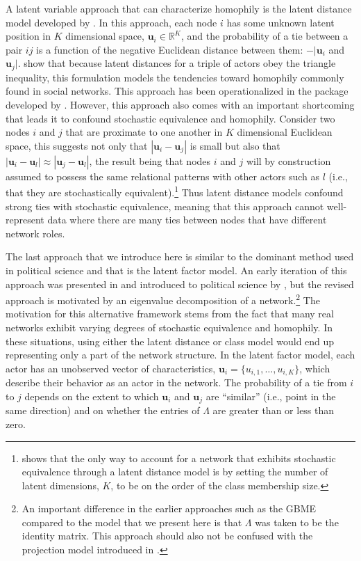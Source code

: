 A latent variable approach that can characterize homophily is the latent distance model developed by \citet{hoff:etal:2002}. In this approach, each node $i$ has some unknown latent position in $K$ dimensional space, $\bm u_{i} \in \mathbb{R}^{K}$, and the probability of a tie between a pair $ij$ is a function of the negative Euclidean distance between them: $-|\bm u_{i}$ and $\bm u_{j}|$. \citet{hoff:etal:2002} show that because latent distances for a triple of actors obey the triangle inequality, this formulation models the tendencies toward homophily commonly found in social networks. This approach has been operationalized in the  package developed by \citet{krivitsky:handcock:2015}. However, this approach also comes with an important shortcoming that leads it to confound stochastic equivalence and homophily. Consider two nodes $i$ and $j$ that are proximate to one another in $K$ dimensional Euclidean space, this suggests not only that $|\bm u_{i} - \bm u_{j}|$ is small but also that $|\bm u_{i} - \bm u_{l}| \approx |\bm u_{j} - \bm u_{l}|$, the result being that nodes $i$ and $j$ will by construction assumed to possess the same relational patterns with other actors such as $l$ (i.e., that they are stochastically equivalent).\footnote{\citet{hoff:2008} shows that the only way to account for a network that exhibits stochastic equivalence through a latent distance model is by setting the number of latent dimensions, $K$, to be on the order of the class membership size.} Thus latent distance models confound strong ties with stochastic equivalence, meaning that this approach cannot well-represent data where there are many ties between nodes that have different network roles. 

The last approach that we introduce here is similar to the dominant method used in political science and that is the latent factor model. An early iteration of this approach was presented in \citet{hoff:2005} and introduced to political science by \citet{hoff:ward:2004}, but the revised approach is motivated by an eigenvalue decomposition of a network.\footnote{An important difference in the earlier approaches such as the GBME compared to the model that we present here is that $\Lambda$ was taken to be the identity matrix. This approach should also not be confused with the projection model introduced in \citet{hoff:etal:2002}.} The motivation for this alternative framework stems from the fact that many real networks exhibit varying degrees of stochastic equivalence and homophily. In these situations, using either the latent distance or class model would end up representing only a part of the network structure. In the latent factor model, each actor has an unobserved vector of characteristics, $\bm u_{i} = \{u_{i,1}, \ldots, u_{i,K} \}$, which describe their behavior as an actor in the network. The probability of a tie from $i$ to $j$ depends on the extent to which $\bm u_{i}$ and $\bm u_{j}$ are ``similar'' (i.e., point in the same direction) and on whether the entries of $\Lambda$ are greater than or less than zero. 

